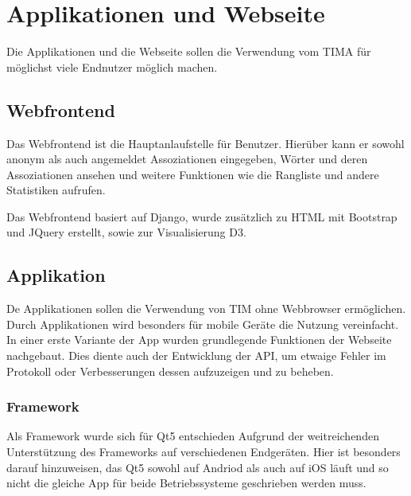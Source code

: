 \chapter{Applikationen und Webseite}
Die Applikationen und die Webseite sollen die Verwendung vom TIMA für möglichst
viele Endnutzer möglich machen.

\section{Webfrontend}
Das Webfrontend ist die Hauptanlaufstelle für Benutzer. Hierüber kann er sowohl anonym als auch angemeldet Assoziationen eingegeben, Wörter und
deren Assoziationen ansehen und weitere Funktionen wie die Rangliste und andere Statistiken aufrufen.

Das Webfrontend basiert auf Django, wurde zusätzlich zu HTML mit Bootstrap und JQuery erstellt, sowie zur Visualisierung D3.

\section{Applikation}
De Applikationen sollen die Verwendung von TIM ohne Webbrowser ermöglichen. Durch Applikationen wird besonders für mobile Geräte die Nutzung
vereinfacht.
In einer erste Variante der App wurden grundlegende Funktionen der
Webseite nachgebaut.  Dies diente auch der Entwicklung der API, um etwaige
Fehler im Protokoll oder Verbesserungen dessen aufzuzeigen und zu beheben.

\subsection{Framework}
Als Framework wurde sich für Qt5 entschieden Aufgrund der weitreichenden
Unterstützung des Frameworks auf verschiedenen Endgeräten. Hier ist besonders darauf hinzuweisen, das Qt5 sowohl auf Andriod als auch auf iOS läuft und so nicht die gleiche App für beide Betriebssysteme geschrieben werden muss.

